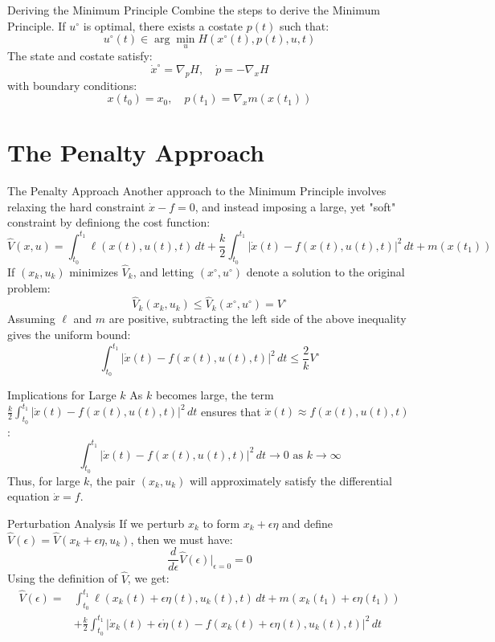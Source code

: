 \documentclass[10pt]{beamer}
\begin{document}
\begin{frame}{Deriving the Minimum Principle}
  Combine the steps to derive the Minimum Principle. If \( u^\circ \) is optimal, there exists a costate \( p(t) \) such that:
  \[
  u^\circ(t) \in \arg \min_u H(x^\circ(t), p(t), u, t)
  \]
  The state and costate satisfy:
  \[
  \dot{x}^\circ = \nabla_p H, \quad \dot{p} = -\nabla_x H
  \]
  with boundary conditions:
  \[
  x(t_0) = x_0, \quad p(t_1) = \nabla_x m(x(t_1))
  \]
\end{frame}
  
\section{The Penalty Approach}
  
\begin{frame}[fragile]{The Penalty Approach}
  Another approach to the Minimum Principle involves relaxing the hard constraint \( \dot{x} - f = 0 \), and instead imposing a large, yet "soft" constraint by  definiong the cost function:
  \[
  \hat{V}(x, u) = \int_{t_0}^{t_1} \ell(x(t), u(t), t) \, dt + \frac{k}{2} \int_{t_0}^{t_1} |\dot{x}(t) - f(x(t), u(t), t)|^2 \, dt + m(x(t_1))
  \]
  If \( (x_k, u_k) \) minimizes \( \hat{V}_k \), and letting \( (x^\circ, u^\circ) \) denote a solution to the original problem:
  \[
  \hat{V}_k(x_k, u_k) \leq \hat{V}_k(x^\circ, u^\circ) = V^\circ
  \]
  Assuming \( \ell \) and \( m \) are positive, subtracting the left side of the above inequality gives the uniform bound:
  \[
  \int_{t_0}^{t_1} |\dot{x}(t) - f(x(t), u(t), t)|^2 \, dt \leq \frac{2}{k} V^\circ
  \]
\end{frame}
  
\begin{frame}[fragile]{Implications for Large \( k \)}
  As \( k \) becomes large, the term \( \frac{k}{2} \int_{t_0}^{t_1} |\dot{x}(t) - f(x(t), u(t), t)|^2 \, dt \) ensures that \( \dot{x}(t) \approx f(x(t), u(t), t) \):
  \[
    \int_{t_0}^{t_1} |\dot{x}(t) - f(x(t), u(t), t)|^2 \, dt \rightarrow 0 \text{ as } k \rightarrow \infty
  \]
  Thus, for large \( k \), the pair \( (x_k, u_k) \) will approximately satisfy the differential equation \( \dot{x} = f \).
\end{frame}
  
\begin{frame}[fragile]{Perturbation Analysis}
  If we perturb \( x_k \) to form \( x_k + \epsilon \eta \) and define \( \hat{V}(\epsilon) = \hat{V}(x_k + \epsilon \eta, u_k) \), then we must have:
  \[
  \frac{d}{d\epsilon} \hat{V}(\epsilon) \bigg|_{\epsilon=0} = 0
  \]
  Using the definition of \( \hat{V} \), we get:
  \[
  \begin{aligned}
    \hat{V}(\epsilon) = &\int_{t_0}^{t_1} \ell(x_k(t) + \epsilon \eta(t), u_k(t), t) \, dt + m(x_k(t_1) + \epsilon \eta(t_1)) \\
    &+ \frac{k}{2} \int_{t_0}^{t_1} |\dot{x}_k(t) + \epsilon \dot{\eta}(t) - f(x_k(t) + \epsilon \eta(t), u_k(t), t)|^2 \, dt
  \end{aligned}
  \]
\end{frame}
  
\end{document}
